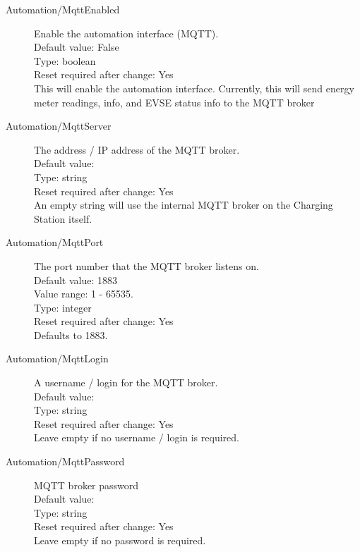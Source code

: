 \begin{description}
\item[Automation/MqttEnabled] Enable the automation interface (MQTT).\\
  Default value: False\\
  Type: boolean\\
  Reset required after change: Yes\\
  This will enable the automation interface. Currently, this will send energy meter readings, info, and EVSE status info to the MQTT broker\\

\item[Automation/MqttServer] The address / IP address of the MQTT broker.\\
  Default value: \\
  Type: string\\
  Reset required after change: Yes\\
  An empty string will use the internal MQTT broker on the Charging Station itself.\\

\item[Automation/MqttPort] The port number that the MQTT broker listens on.\\
  Default value: 1883\\
  Value range: 1 - 65535.\\
  Type: integer\\
  Reset required after change: Yes\\
  Defaults to 1883.\\

\item[Automation/MqttLogin] A username / login for the MQTT broker.\\
  Default value: \\
  Type: string\\
  Reset required after change: Yes\\
  Leave empty if no username / login is required.\\

\item[Automation/MqttPassword] MQTT broker password\\
  Default value: \\
  Type: string\\
  Reset required after change: Yes\\
  Leave empty if no password is required.\\


\end{description}
